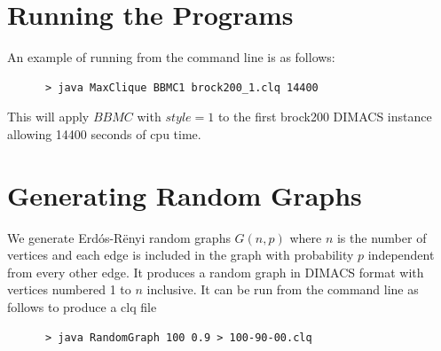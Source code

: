\documentclass{l4proj}
\theoremstyle{definition}
\begin{document}
\begin{appendices}

\chapter{Running the Programs}
An example of running from the command line is as follows:
\begin{verbatim}
      > java MaxClique BBMC1 brock200_1.clq 14400
\end{verbatim}
This will apply $BBMC$ with $style = 1$ to the first brock200 DIMACS instance allowing 14400 seconds of cpu time.

\chapter{Generating Random Graphs}
\label{sec:randomGraph}
We generate Erd\'{o}s-R\"{e}nyi random graphs $G(n,p)$ where $n$ is the number of vertices and
each edge is included in the graph with probability $p$ independent from every other edge. It produces
a random graph in DIMACS format with vertices numbered 1 to $n$ inclusive. It can be run from the command line as follows to produce 
a clq file
\begin{verbatim}
      > java RandomGraph 100 0.9 > 100-90-00.clq
\end{verbatim}
\end{appendices}




\end{document}
